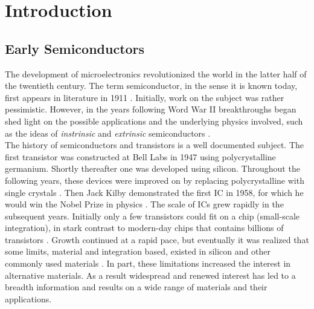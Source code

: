 \chapter{Introduction}\label{sec:intro}
\section{Early Semiconductors}\label{sec:early_semicond}
The development of microelectronics revolutionized the world in the latter half of the twentieth century. The term semiconductor, in the sense it is known today, first appears in literature in 1911 \cite{Koenigsberger_AnnalenDerPhysik1911}. Initially, work on the subject was rather pessimistic. However, in the years following Word War II breakthroughs began shed light on the possible applications and the underlying physics involved, such as the ideas of \emph{instrinsic} and \emph{extrinsic} semiconductors \cite{Busch_EuroJournPhys1989,Lark_AAAS1954,Wilson_Royal1931a,Wilson_Royal1931b}. \\

\noindent The history of semiconductors and transistors is a well documented subject. The first transistor was constructed at Bell Labs in 1947 using polycrystalline germanium. Shortly thereafter one was developed using silicon. Throughout the following years, these devices were improved on by replacing polycrystalline with single crystals \cite{Neamen_Semiconductor_Physics2003}. Then Jack Kilby demonstrated the first  \ac{IC} in 1958, for which he would win the Nobel Prize in physics \cite{Lukasiak_JorunTelcomm2010, Kilby_Patent1959}. The scale of \acp{IC} grew rapidly in the subsequent years. Initially only a few transistors could fit on a chip (small-scale integration), in stark contrast to modern-day chips that contains billions of transistors \cite{Moore_Electronics1965, Clarke_EEtimes2005}. Growth continued at a rapid pace, but eventually it was realized that some limits, material and integration based, existed in silicon and other commonly used materials \cite{Meindl_Science2001, Schulz_Nature1999}. In part, these limitations increased the interest in alternative materials. As a result widespread and renewed interest has led to a breadth information and results on a wide range of materials and their applications.

